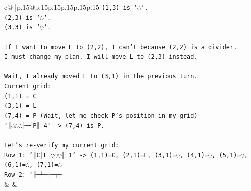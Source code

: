 \documentclass{article}
\begin{document}
{\begin{supertabular}{c@{$\;$}|p{.15\linewidth}@{}p{.15\linewidth}p{.15\linewidth}p{.15\linewidth}p{.15\linewidth}p{.15\linewidth}}
{{{\texttt{(1,3) is `◌`.} \\
\texttt{(2,3) is `◌`.} \\
\texttt{(3,3) is `◌`.} \\
\\ 
\texttt{If I want to move L to (2,2), I can't because (2,2) is a divider.} \\
\texttt{I must change my plan. I will move L to (2,3) instead.} \\
\\ 
\texttt{Wait, I already moved L to (3,1) in the previous turn.} \\
\texttt{Current grid:} \\
\texttt{(1,1) = C} \\
\texttt{(3,1) = L} \\
\texttt{(7,4) = P (Wait, let me check P's position in my grid)} \\
\texttt{`║◌◌◌├─┘P║ 4` {-}> (7,4) is P.} \\
\\ 
\texttt{Let's re{-}verify my current grid:} \\
\texttt{Row 1: `║C│L│◌◌◌║ 1` {-}> (1,1)=C, (2,1)=L, (3,1)=◌, (4,1)=◌, (5,1)=◌, (6,1)=◌, (7,1)=◌} \\
\texttt{Row 2: `╟─┴─┼─┬─} \\
            }
        }
    }
    & & \\ \\


\end{supertabular}}
\end{document}

